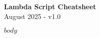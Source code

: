 \documentclass[8pt,landscape,a4paper]{article}
\begin{document}
\begin{center}
{\Large \textbf{Lambda Script Cheatsheet}} \\
{\small August 2025 - v1.0}
\end{center}

\vspace{3pt}

\begin{multicols}{3}

$body$

\end{multicols}
\end{document}
